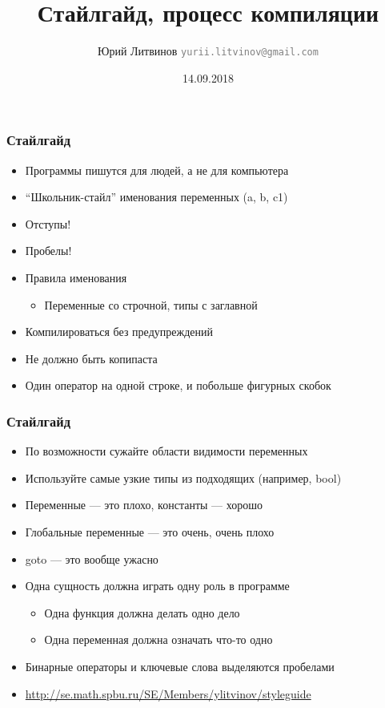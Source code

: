 \documentclass[xetex,mathserif,serif]{beamer}
\title{Стайлгайд, процесс компиляции}
\author[Юрий Литвинов]{Юрий Литвинов \newline \textcolor{gray}{\small\texttt{yurii.litvinov@gmail.com}}}
\date{14.09.2018}
\begin{document}
	
	\frame{\titlepage}
	
	\begin{frame}
		\frametitle{Стайлгайд}
		\begin{itemize}
			\item Программы пишутся для людей, а не для компьютера
			\item ``Школьник-стайл'' именования переменных (a, b, c1)
			\item Отступы!
			\item Пробелы!
			\item Правила именования
			\begin{itemize}
				\item Переменные со строчной, типы с заглавной
			\end{itemize}
			\item Компилироваться без предупреждений
			\item Не должно быть копипаста
			\item Один оператор на одной строке, и побольше фигурных скобок
		\end{itemize}
	\end{frame}

	\begin{frame}
		\frametitle{Стайлгайд}
		\begin{itemize}
			\item По возможности сужайте области видимости переменных
			\item Используйте самые узкие типы из подходящих (например, bool)
			\item Переменные --- это плохо, константы --- хорошо
			\item Глобальные переменные --- это очень, очень плохо
			\item goto --- это вообще ужасно
			\item Одна сущность должна играть одну роль в программе
			\begin{itemize}
				\item Одна функция должна делать одно дело
				\item Одна переменная должна означать что-то одно
			\end{itemize}
			\item Бинарные операторы и ключевые слова выделяются пробелами
			\item \url{http://se.math.spbu.ru/SE/Members/ylitvinov/styleguide}
		\end{itemize}
	\end{frame}
\end{document}
